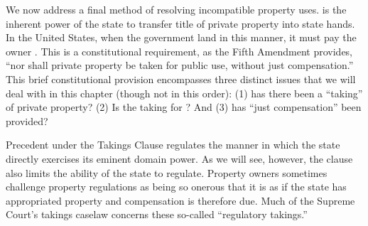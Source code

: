We now address a final method of resolving incompatible property uses.
 is the inherent power of the state to
transfer title of
private property into state hands. In the United States, when the government
 land in this manner, it must pay the owner . This
is a constitutional requirement, as the Fifth Amendment provides, ``nor shall
private property be taken for public use, without just compensation.'' This
brief constitutional provision encompasses three distinct issues that we will
deal with in this chapter (though not in this order): (1) has there been a
``taking'' of private property? (2) Is the taking for ? And (3)
has ``just compensation'' been provided?

Precedent under the Takings Clause regulates the manner in which the state
directly exercises its eminent domain power. As we will see, however, the clause
also limits the ability of the state to regulate. Property owners sometimes
challenge property regulations as being so onerous that it is as if the state
has appropriated property and compensation is therefore due. Much of the Supreme
Court's takings caselaw concerns these so-called ``regulatory takings.''

